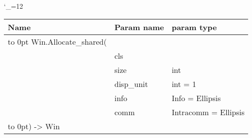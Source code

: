 \begingroup \catcode`\_=12 \tt
\begin{tabular}{lll}
\toprule
\textrm{Name}&\textrm{Param name}&\textrm{param type}\\
\midrule
\hbox to 0pt {Win.Allocate_shared(\hss}\\
& cls\\
& size & int\\
& disp_unit & int = 1\\
& info & Info = Ellipsis\\
& comm & Intracomm = Ellipsis\\
\hbox to 0pt{) -> Win\hss}\\
\bottomrule
\end{tabular}
\endgroup
